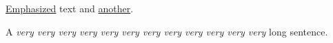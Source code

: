 \uline{Emphasized} text and \uline{another}.

A \emph{very very very very very very very
very very very very very} long sentence.
